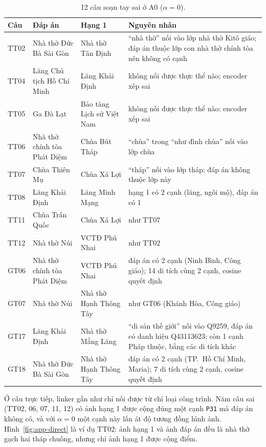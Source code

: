 \begin{table}[!htb]
\centering
\caption{12 câu soạn tay sai ở A0 ($\alpha=0$).}
\label{tab:app-fail}
\scriptsize
\setlength{\tabcolsep}{2.5pt}
\begin{tabular}{@{}l>{\raggedright\arraybackslash}p{1.75cm}>{\raggedright\arraybackslash}p{1.75cm}%
>{\raggedright\arraybackslash}p{3.85cm}@{}}
\toprule
Câu & Đáp án & Hạng 1 & Nguyên nhân \\
\midrule
TT02 & Nhà thờ Đức Bà Sài Gòn & Nhà thờ Tân Định & ``nhà thờ'' nối vào lớp nhà thờ Kitô giáo; đáp án thuộc
lớp con nhà thờ chính tòa nên không có cạnh \\
TT04 & Lăng Chủ tịch Hồ Chí Minh & Lăng Khải Định & không nối được thực thể nào; encoder xếp sai \\
TT05 & Ga Đà Lạt & Bảo tàng Lịch sử Việt Nam & không nối được thực thể nào; encoder xếp sai \\
TT06 & Nhà thờ chính tòa Phát Diệm & Chùa Bút Tháp & ``chùa'' trong ``như đình chùa'' nối vào lớp chùa \\
TT07 & Chùa Thiên Mụ & Chùa Xá Lợi & ``tháp'' nối vào lớp tháp; đáp án không thuộc lớp này \\
TT08 & Lăng Khải Định & Lăng Minh Mạng & hạng 1 có 2 cạnh (lăng, ngôi mộ), đáp án có 1 \\
TT11 & Chùa Trấn Quốc & Chùa Xá Lợi & như TT07 \\
TT12 & Nhà thờ Núi & VCTĐ Phú Nhai & như TT02 \\
GT06 & Nhà thờ chính tòa Phát Diệm & VCTĐ Phú Nhai & đáp án có 2 cạnh (Ninh Bình, Công giáo); 14 di tích
cùng 2 cạnh, cosine quyết định \\
GT07 & Nhà thờ Núi & Nhà thờ Hạnh Thông Tây & như GT06 (Khánh Hòa, Công giáo) \\
GT17 & Lăng Khải Định & Nhà thờ Mằng Lăng & ``di sản thế giới'' nối vào Q9259, đáp án có danh hiệu Q43113623; còn 1
cạnh Pháp thuộc, bằng các di tích khác \\
GT18 & Nhà thờ Đức Bà Sài Gòn & Nhà thờ Hạnh Thông Tây & đáp án có 2 cạnh (TP.~Hồ Chí Minh, Maria); 7 di tích
cùng 2 cạnh, cosine quyết định \\
\bottomrule
\end{tabular}
\end{table}

Ở câu trực tiếp, linker gần như chỉ nối được từ chỉ loại công trình. Năm câu sai (TT02, 06, 07, 11, 12) có ảnh
hạng 1 được cộng đúng một cạnh \texttt{P31} mà đáp án không có, và với $\alpha=0$ một cạnh này lấn át độ tương đồng
hình ảnh. Hình~\ref{fig:app-direct} là ví dụ TT02: ảnh hạng 1 và ảnh đáp án đều là nhà thờ gạch hai tháp chuông,
nhưng chỉ ảnh hạng 1 được cộng điểm.

